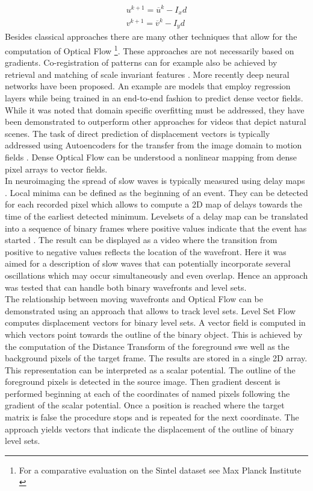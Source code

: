 \begin{equation}
  \begin{array}{l}
    u^{k+1}=\overline{u}^k - I_x d \\
    v^{k+1}=\overline{v}^k - I_y d
  \end{array}
\label{eqn:iterative_scheme}
\end{equation}
Besides classical approaches there are many other techniques that allow for the computation of Optical Flow \footnote{For a comparative evaluation on the Sintel dataset see Max Planck Institute \parencite*{mpi2020sintel}}. These approaches are not necessarily based on gradients. Co-registration of patterns can for example also be achieved by retrieval and matching of scale invariant features \parencite{zhang2014scale}. More recently deep neural networks have been proposed. An example are models that employ regression layers while being trained in an end-to-end fashion to predict dense vector fields. While it was noted that domain specific overfitting must be addressed, they have been demonstrated to outperform other approaches for videos that depict natural scenes. The task of direct prediction of displacement vectors is typically addressed using Autoencoders for the transfer from the image domain to motion fields \parencite{hur2020optical}. Dense Optical Flow can be understood a nonlinear mapping from dense pixel arrays to vector fields.\\
In neuroimaging the spread of slow waves is typically measured using delay maps \parencite{celotto2020analysis}. Local minima can be defined as the beginning of an event. They can be detected for each recorded pixel which allows to compute a 2D map of delays towards the time of the earliest detected minimum. Levelsets of a delay map can be translated into a sequence of binary frames where positive values indicate that the event has started \parencite{celotto2020analysis}. The result can be displayed as a video where the transition from positive to negative values reflects the location of the wavefront. Here it was aimed for a description of slow waves that can potentially incorporate several oscillations which may occur simultaneously and even overlap. Hence an approach was tested that can handle both binary wavefronts and level sets.\\
The relationship between moving wavefronts and Optical Flow can be demonstrated using an approach that allows to track level sets. Level Set Flow computes displacement vectors for binary level sets. A vector field is computed in which vectors point towards the outline of the binary object. This is achieved by the computation of the Distance Transform of the foreground swe well as the background pixels of the target frame. The results are stored in a single 2D array. This representation can be interpreted as a scalar potential. The outline of the foreground pixels is detected in the source image. Then gradient descent is performed beginning at each of the coordinates of named pixels following the gradient of the scalar potential. Once a position is reached where the target matrix is false the procedure stops and is repeated for the next coordinate. The approach yields vectors that indicate the displacement of the outline of binary level sets.\\

